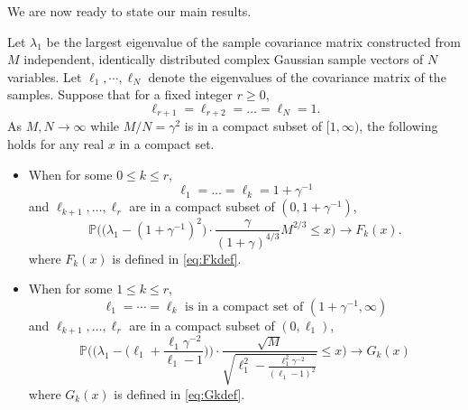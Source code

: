 \documentclass[11pt]{article}
\begin{document}
We are now ready to state our main results.


\begin{theo}\label{thm:main}
Let $\lambda_1$ be the largest eigenvalue of the sample covariance
matrix constructed from $M$ independent, identically distributed
complex Gaussian sample vectors of $N$ variables. Let $\ell_1,
\cdots, \ell_N$ denote the eigenvalues of the covariance matrix of
the samples. Suppose that for a fixed integer $r\ge 0$,
\begin{equation}
  \ell_{r+1}=\ell_{r+2}=\dots =\ell_N=1.
\end{equation}
As $M,N\to \infty$ while $M/N=\gamma^2$ is in a compact subset of
$[1,\infty)$, the following holds for any real $x$ in a compact
set.
\begin{itemize}
\item[(a)] When for some $0\le k\le r$,
\begin{equation}
  \ell_1=\dots= \ell_k=1+\gamma^{-1}
\end{equation}
and $\ell_{k+1}, \dots, \ell_{r}$ are in a compact subset
of $(0, 1+\gamma^{-1})$,
\begin{equation}\label{eq:mainF}
  \mathbb{P} \biggl( \bigr( \lambda_1 - (1+\gamma^{-1})^2 \bigr) \cdot
  \frac{\gamma}{(1+\gamma)^{4/3}} M^{2/3} \le x \biggr)
  \to F_k(x).
\end{equation}
where $F_k(x)$ is defined in \eqref{eq:Fkdef}.
\item[(b)] When for some $1\le k\le r$,
\begin{equation}
  \text{$\ell_1=\cdots=\ell_k$ is in a compact set of $(1+\gamma^{-1}, \infty)$}
\end{equation}
and $\ell_{k+1}, \dots, \ell_r$ are in a compact subset of
$(0, \ell_1)$,
\begin{equation}\label{eq:mainG}
  \mathbb{P} \biggl( \bigr( \lambda_1 -
  \bigl(\ell_1+\frac{\ell_1\gamma^{-2}}{\ell_1-1}\bigr) \bigr) \cdot
  \frac{\sqrt{M}}{\sqrt{\ell_1^2-\frac{\ell_1^2\gamma^{-2}}{(\ell_1-1)^2}}} \le x \biggr)
  \to G_k(x)
\end{equation}
where $G_k(x)$ is defined in \eqref{eq:Gkdef}.
\end{itemize}
\end{theo}
\end{document}

